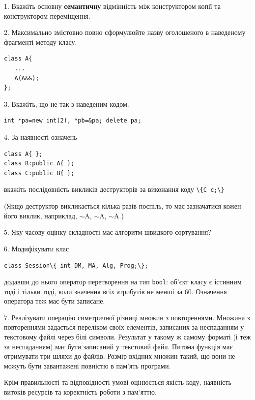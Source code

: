 \documentclass[12pt, ukrainian]{article}
\def\code#1{\Verb!#1!}
\begin{document}
{%
1. Вкажіть основну \textbf{семантичну} відмінність між конструктором копії та конструктором переміщення.%
\par
\vspace{2mm}
2. Максимально змістовно повно сформулюйте назву оголошеного в наведеному фрагменті методу класу.
\vspace{-3mm}
\begin{verbatim}class A{
   ...
   A(A&&);
};\end{verbatim}
\vspace{-3mm}
\par
\vspace{2mm}
3. Вкажіть, що не так з наведеним кодом.
\vspace{-3mm}
\begin{verbatim}int *pa=new int(2), *pb=&pa; delete pa;\end{verbatim}
\vspace{-3mm}
\par
\vspace{2mm}
4. За наявності означень
\vspace{-3mm}
\begin{verbatim}
class A{ };
class B:public A{ };
class C:public B{ };\end{verbatim}
\vspace{-3mm}
вкажіть послідовність викликів деструкторів за виконання коду \code{\{C c;\}} 

(Якщо деструктор викликається кілька разів поспіль, то має зазначатися кожен його виклик, наприклад, $\sim$A, $\sim$A, $\sim$A.)

\vspace{2mm}
5. Яку часову оцінку складності має алгоритм швидкого сортування?
\par
\vspace{2mm}
6. Модифікувати клас 

\qquad\code{class Session\{ int DM, MA, Alg, Prog;\};} 


додавши до нього оператор перетворення на тип \code{bool}: об'єкт класу є істинним тоді і тільки тоді, коли значення всіх атрибутів не менші за 60. Означення оператора теж має бути записане.%
\par
\vspace{2mm}
7. 
Реалізувати операцію симетричної різниці множин з повтореннями. Множина з повтореннями задається переліком своїх елементів, записаних за неспаданням у текстовому файлі через білі символи. Результат у такому ж самому форматі (і теж за неспаданням) має бути записаний у текстовий файл. Питома функція має отримувати три шляхи до файлів. Розмір вхідних множин такий, що вони не можуть бути завантажені повністю в пам’ять програми.

Крім правильності та відповідності умові оцінюється якість коду, наявність витоків ресурсів та коректність роботи з пам'яттю. 

}
\end{document}
